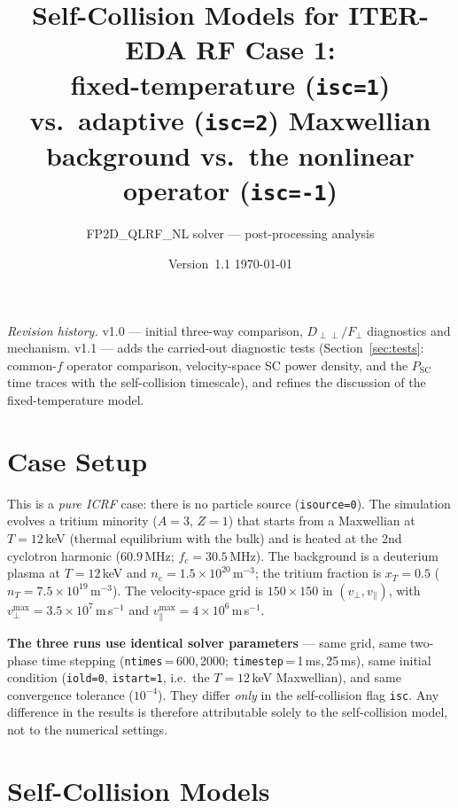 \documentclass[11pt,a4paper]{article}
\title{%
  Self-Collision Models for ITER-EDA RF Case 1:\\
  fixed-temperature (\texttt{isc=1}) vs.\ adaptive (\texttt{isc=2})
  Maxwellian background vs.\ the nonlinear operator (\texttt{isc=-1})
}
\author{FP2D\_QLRF\_NL solver --- post-processing analysis}
\date{Version~1.1 \quad\textbullet\quad \today}
\begin{document}
\maketitle
\tableofcontents
\bigskip

\noindent\emph{Revision history.}\;
v1.0 --- initial three-way comparison, $D_{\perp\perp}/F_\perp$ diagnostics and
mechanism.\;
v1.1 --- adds the carried-out diagnostic tests (Section~\ref{sec:tests}:
common-$f$ operator comparison, velocity-space SC power density, and the
$P_\text{SC}$ time traces with the self-collision timescale), and refines the
discussion of the fixed-temperature model.
\bigskip

\section{Case Setup}

This is a \emph{pure ICRF} case: there is no particle source
(\texttt{isource=0}). The simulation evolves a tritium minority ($A=3$, $Z=1$)
that starts from a Maxwellian at $T = 12$\,keV (thermal equilibrium with the
bulk) and is heated at the 2nd cyclotron harmonic (60.9\,MHz; $f_c=30.5$\,MHz).
The background is a deuterium plasma at $T = 12$\,keV and
$n_e = 1.5\times10^{20}$\,m$^{-3}$; the tritium fraction is $x_T = 0.5$
($n_T = 7.5\times10^{19}$\,m$^{-3}$). The velocity-space
grid is $150\times150$ in $(v_\perp, v_\parallel)$, with
$v_\perp^{\max} = 3.5\times10^{7}$\,m\,s$^{-1}$ and
$v_\parallel^{\max} = 4\times10^{6}$\,m\,s$^{-1}$.

\textbf{The three runs use identical solver parameters} --- same grid, same
two-phase time stepping (\texttt{ntimes}\,=\,600,\,2000;
\texttt{timestep}\,=\,1\,ms,\,25\,ms), same initial condition
(\texttt{iold=0}, \texttt{istart=1}, i.e.\ the $T=12$\,keV Maxwellian), and
same convergence tolerance ($10^{-4}$). They differ \emph{only} in the
self-collision flag \texttt{isc}. Any difference in the results is therefore
attributable solely to the self-collision model, not to the numerical
settings.

\section{Self-Collision Models}
\end{document}
